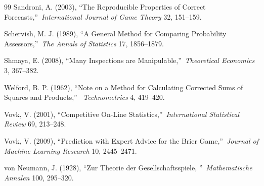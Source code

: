 \documentclass[12pt,a4paper,notitlepage]{article}
\begin{document}
\begin{thebibliography}{99}
\bibitem{} Sandroni, A. (2003), \textquotedblleft The Reproducible
Properties of Correct Forecasts,\textquotedblright\ \emph{International
Journal of Game Theory} 32, 151--159.

\bibitem{} Schervish, M. J. (1989), \textquotedblleft A General Method for
Comparing Probability Assessors,\textquotedblright\ \emph{The Annals of
Statistics} 17, 1856--1879.

\bibitem{} Shmaya, E. (2008), \textquotedblleft Many Inspections are
Manipulable,\textquotedblright\ \emph{Theoretical Economics} 3, 367--382.

\bibitem{} Welford, B. P. (1962), \textquotedblleft Note on a Method for
Calculating Corrected Sums of Squares and Products,\textquotedblright\ \emph{%
Technometrics} 4, 419--420.

\bibitem{} Vovk, V. (2001), \textquotedblleft Competitive On-Line
Statistics,\textquotedblright\ \emph{International Statistical Review} 69,
213--248.

\bibitem{} Vovk, V. (2009), \textquotedblleft Prediction with Expert
Advice for the Brier Game,\textquotedblright\ \emph{Journal of Machine
Learning Research} 10, 2445--2471.

\bibitem{} von Neumann, J. (1928), \textquotedblleft Zur Theorie der
Gesellschaftsspiele, \textquotedblright\ \emph{Mathematische Annalen} 100,
295--320.
\end{thebibliography}
\end{document}
